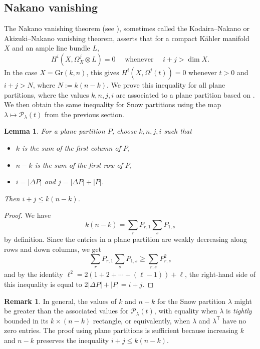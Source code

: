 \documentclass{amsart}
\newcommand\T{\mathsf{T}}
\theoremstyle{plain}
\newtheorem{lemma}[lemma]{Lemma}
\theoremstyle{definition}
\newtheorem{remark}[remark]{Remark}
\numberwithin{equation}{section}
\begin{document}
\subsection{Nakano vanishing}
\label{sec: nakano}

The Nakano vanishing theorem (see \cite{Nak54}), sometimes called the Kodaira--Nakano or Akizuki--Nakano vanishing theorem, asserts that for a compact K\"ahler manifold $X$ and an ample line bundle $L$, 
\[H^i(X,\Omega_X^j\otimes L)=0\quad \text{ whenever }\quad i+j>\dim X.\]
In the case $X=\mathrm{Gr}(k,n)$, this gives $H^i(X,\Omega^j(t))=0$ whenever $t>0$ and $i+j>N$, where $N:=k(n-k)$. We prove this inequality for all plane partitions, where the values $k,n,j,i$ are associated to a plane partition based on . We then obtain the same inequality for Snow partitions using the map $\lambda\mapsto\mathcal{P}_\lambda(t)$ from the previous section.

\begin{lemma}\label{lem:nakano}
For a plane partition $P$, choose $k,n,j,i$ such that
\begin{itemize}
\item $k$ is the sum of the first column of $P$,
\item $n-k$ is the sum of the first row of $P$,
\item $i=|\Delta P|$ and $j=|\Delta P|+|P|$.
\end{itemize}
Then $i+j\leq k(n-k)$.
\end{lemma}
\begin{proof}
We have
\[k(n-k)=\sum_{r}P_{r,1}\sum_s P_{1,s}\]
by definition. Since the entries in a plane partition are weakly decreasing along rows and down columns, we get
\[\sum_r P_{r,1}\sum_s P_{1,s}\geq \sum_{r,s}P_{r,s}^2\]
and by the identity $\ell^2=2(1+2+\cdots+(\ell-1))+\ell$, the right-hand side of this inequality is equal to $2|\Delta P|+|P|=i+j$.
\end{proof}
\begin{remark}\label{rmk:tightly-bounded}
In general, the values of $k$ and $n-k$ for the Snow partition $\lambda$ might be greater than the associated values for $\mathcal{P}_\lambda(t)$, with equality when $\lambda$ is \emph{tightly} bounded in its $k\times(n-k)$ rectangle, or equivalently, when $\lambda$ and $\lambda^\T$ have no zero entries. The proof using plane partitions is sufficient because increasing $k$ and $n-k$ preserves the inequality $i+j\leq k(n-k)$.
\end{remark}
\end{document}
